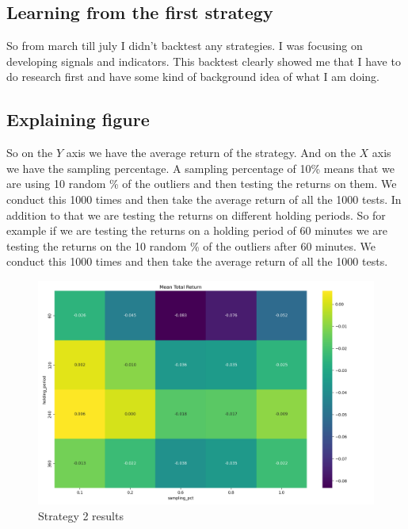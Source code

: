 \documentclass[12pt]{article}
\begin{document}
\subsection{Learning from the first strategy}
So from march till july I didn't backtest any strategies. I was focusing on developing signals and indicators. This backtest clearly showed me that I have to do research first and have some kind of background idea of what I am doing.


\newpage

\subsection{Explaining figure}
So on the $Y$ axis we have the average return of the strategy. And on the $X$ axis we have the sampling percentage. 
A sampling percentage of 10\% means that we are using 10 random \% of the outliers and then testing the returns on them. We conduct this 1000 times and then take the average return of all the 1000 tests. In addition to that we are testing the returns on different holding periods. So for example if we are testing the returns on a holding period of 60 minutes we are testing the returns on the 10 random \% of the outliers after 60 minutes. We conduct this 1000 times and then take the average return of all the 1000 tests.




\begin{figure}[H]
  \centering
  \includegraphics[width=\textwidth]{imgs/Bullish_outliers_inside_of_uptrend.png}
  \caption{Strategy 2 results}
  \label{fig:bullish_outliers_inside_of_uptrend}
\end{figure}
\end{document}
